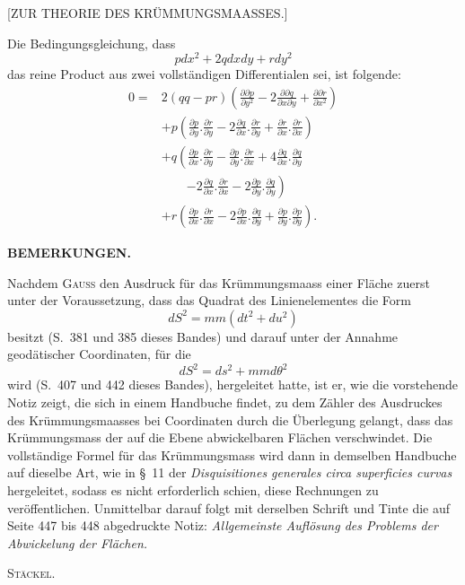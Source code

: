 \clearpage
{}
\begin{center}\large [ZUR THEORIE DES KRÜMMUNGSMAASSES.]\end{center}
\noindent\hspace*{1.2em}Die Bedingungsgleichung, dass
\[
pdx^2+2qdxdy+rdy^2
\]
\noindent das reine Product aus zwei vollständigen Differentialen sei, ist folgende:
\[
\begin{aligned}
0={}&2(qq-pr)\left(\frac{\partial\partial p}{\partial y^2}
-2\frac{\partial\partial q}{\partial x\partial y}
+\frac{\partial\partial r}{\partial x^2}\right)\\
&+p\left(\frac{\partial p}{\partial y}.\frac{\partial r}{\partial y}
-2\frac{\partial q}{\partial x}.\frac{\partial r}{\partial y}
+\frac{\partial r}{\partial x}.\frac{\partial r}{\partial x}\right)\\
&+q\left(\frac{\partial p}{\partial x}.\frac{\partial r}{\partial y}
-\frac{\partial p}{\partial y}.\frac{\partial r}{\partial x}
+4\frac{\partial q}{\partial x}.\frac{\partial q}{\partial y}\right.\\
&\qquad\left.-2\frac{\partial q}{\partial x}.\frac{\partial r}{\partial x}
-2\frac{\partial p}{\partial y}.\frac{\partial q}{\partial y}\right)\\
&+r\left(\frac{\partial p}{\partial x}.\frac{\partial r}{\partial x}
-2\frac{\partial p}{\partial x}.\frac{\partial q}{\partial y}
+\frac{\partial p}{\partial y}.\frac{\partial p}{\partial y}\right).
\end{aligned}
\]

\begin{center}\textbf{BEMERKUNGEN.}\end{center}
\noindent\hspace*{1.2em}Nachdem \textsc{Gauss} den Ausdruck für das Krümmungsmaass einer Fläche zuerst unter der Voraussetzung, dass das Quadrat des Linienelementes die Form
\[
dS^2=mm(dt^2+du^2)
\]
\noindent besitzt (S.\ 381 und 385 dieses Bandes) und darauf unter der Annahme geodätischer Coordinaten, für die
\[
dS^2=ds^2+mmd\theta^2
\]
\noindent wird (S.\ 407 und 442 dieses Bandes), hergeleitet hatte, ist er, wie die vorstehende Notiz zeigt, die sich in einem Handbuche findet, zu dem Zähler des Ausdruckes des Krümmungsmaasses bei  Coordinaten durch die Überlegung gelangt, dass das Krümmungsmass der auf die Ebene abwickelbaren Flächen verschwindet. Die vollständige Formel für das Krümmungsmass wird dann in demselben Handbuche auf dieselbe Art, wie in \S\ 11 der \textit{Disquisitiones generales circa superficies curvas} hergeleitet, sodass es nicht erforderlich schien, diese Rechnungen zu veröffentlichen. Unmittelbar darauf folgt mit derselben Schrift und Tinte die auf Seite 447 bis 448 abgedruckte Notiz: \textit{Allgemeinste Auflösung des Problems der Abwickelung der Flächen.}
\begin{flushright}\textsc{Stäckel}.\end{flushright}

